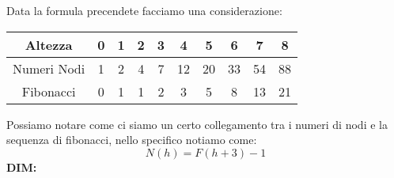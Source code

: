 Data la formula precendete facciamo una considerazione:\\
\begin{center}
    \begin{tabular}{|c|c|c|c|c|c|c|c|c|c|} %
        \hline
        Altezza & 0 & 1 & 2 & 3 & 4 & 5 & 6 & 7 & 8 \\
        \hline
        Numeri Nodi & 1 & 2 & 4 & 7 & 12 & 20 & 33 & 54 & 88 \\
        \hline
        Fibonacci & 0 & 1 & 1 & 2 & 3 & 5 & 8 & 13 & 21 \\
        \hline
    \end{tabular}
\end{center}

Possiamo notare come ci siamo un certo collegamento tra i numeri di nodi e la sequenza di fibonacci, nello specifico notiamo come:
$$ N(h) = F(h+3)-1$$
\textbf{DIM:}